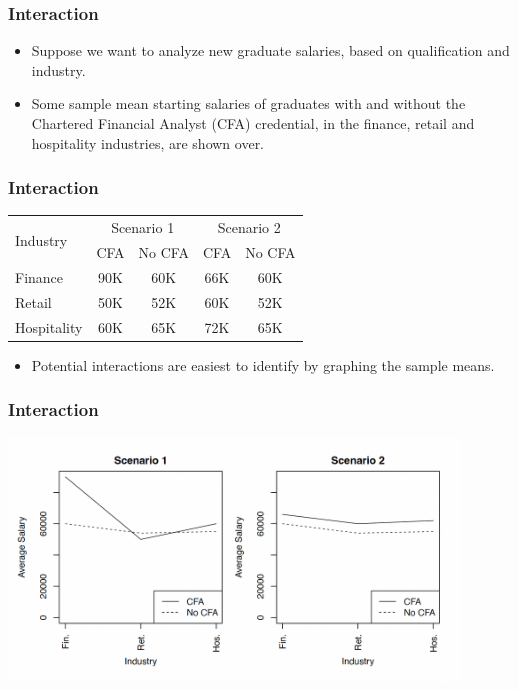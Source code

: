 \documentclass[12pt]{beamer}
\begin{document}
	\begin{frame}
		\frametitle{Interaction}
		
		\begin{itemize}[label={\color{blue}$\blacktriangleright$}]
			\item Suppose we want to analyze new graduate salaries, based on qualification and industry.
			
			\item Some sample mean starting salaries of graduates with and without the Chartered Financial Analyst (CFA) credential, in the finance, retail and hospitality industries, are shown over.
		\end{itemize}
		
	\end{frame}
	\begin{frame}
		\frametitle{Interaction}
		
		\begin{center}
			\begin{tabular}{lcccc}
				\toprule
				\multirow{2}{*}{Industry} & \multicolumn{2}{c}{Scenario 1} & \multicolumn{2}{c}{Scenario 2} \\
				\cline{2-5}
				& CFA & No CFA & CFA & No CFA \\
				\midrule
				Finance & 90K & 60K & 66K & 60K \\
				Retail & 50K & 52K & 60K & 52K \\
				Hospitality & 60K & 65K & 72K & 65K \\
				\bottomrule
			\end{tabular}
		\end{center}
		
		
		\begin{itemize}[label={\color{blue}$\blacktriangleright$}]
			\item Potential interactions are easiest to identify by graphing the sample means.
		\end{itemize}
		
	\end{frame}
		\begin{frame}
		\frametitle{Interaction}
		\centering
\includegraphics[width=12cm]{interaction.png}
	
	\end{frame}
\end{document}
